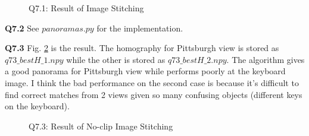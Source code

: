 \documentclass[
  course = {{16-720B Computer Vision}},
  quartile = {{1}},
  assignment = 4\ -\ Feature\ Descriptors\ \&\ Homographies\ \& \  RANSAC,
  name = {{Kangle Deng}},
  email = {{kangled@andrew.cmu.edu}},
  firstexercise = 1
]{aga-homework}
\begin{document}
\begin{figure}
    \centering
    \caption{Q7.1: Result of Image Stitching}
    \label{fig:cv_hw4_q71}
\end{figure}

\noindent \textbf{Q7.2} See $panoramas.py$ for the implementation.

\noindent \textbf{Q7.3} Fig. \ref{fig:cv_hw4_q73} is the result. The homography for Pittsburgh view is stored as $q73\_bestH\_1.npy$ while the other is stored as $q73\_bestH\_2.npy$. The algorithm gives a good panorama for Pittsburgh view while performs poorly at the keyboard image. I think the bad performance on the second case is because it's difficult to find correct matches from 2 views given so many confusing objects (different keys on the keyboard).

\begin{figure}
    \centering
    \caption{Q7.3: Result of No-clip Image Stitching}
    \label{fig:cv_hw4_q73}
\end{figure}
\end{document}
